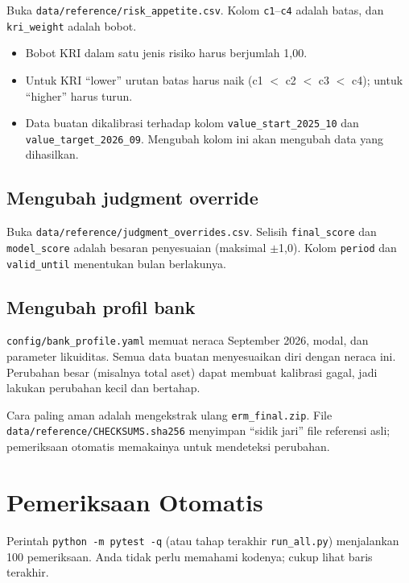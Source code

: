 \documentclass[11pt,a4paper]{article}
\newcommand{\file}[1]{\texttt{\small #1}}
\begin{document}
Buka \file{data/reference/risk\_\allowbreak{}appetite.csv}. Kolom \texttt{c1}--\texttt{c4} adalah batas, dan \texttt{kri\_\allowbreak{}weight} adalah bobot.
\begin{itemize}
\item Bobot KRI dalam satu jenis risiko harus berjumlah 1,00.
\item Untuk KRI ``lower'' urutan batas harus naik (c1 $<$ c2 $<$ c3 $<$ c4); untuk ``higher'' harus turun.
\item Data buatan dikalibrasi terhadap kolom \texttt{value\_\allowbreak{}start\_\allowbreak{}2025\_\allowbreak{}10} dan \texttt{value\_\allowbreak{}target\_\allowbreak{}2026\_\allowbreak{}09}. Mengubah kolom ini akan mengubah data yang dihasilkan.
\end{itemize}

\subsection{Mengubah judgment override}

Buka \file{data/reference/judgment\_\allowbreak{}overrides.csv}. Selisih \texttt{final\_\allowbreak{}score} dan \texttt{model\_\allowbreak{}score} adalah besaran penyesuaian (maksimal $\pm$1,0). Kolom \texttt{period} dan \texttt{valid\_\allowbreak{}until} menentukan bulan berlakunya.

\subsection{Mengubah profil bank}

\file{config/bank\_\allowbreak{}profile.yaml} memuat neraca September 2026, modal, dan parameter likuiditas. Semua data buatan menyesuaikan diri dengan neraca ini. Perubahan besar (misalnya total aset) dapat membuat kalibrasi gagal, jadi lakukan perubahan kecil dan bertahap.

\begin{infobox}
Cara paling aman adalah mengekstrak ulang \file{erm\_\allowbreak{}final.zip}. File \file{data/reference/CHECKSUMS.sha256} menyimpan ``sidik jari'' file referensi asli; pemeriksaan otomatis memakainya untuk mendeteksi perubahan.
\end{infobox}
\section{Pemeriksaan Otomatis}\label{sec:test}

Perintah \texttt{python -m pytest -q} (atau tahap terakhir \texttt{run\_\allowbreak{}all.py}) menjalankan 100 pemeriksaan. Anda tidak perlu memahami kodenya; cukup lihat baris terakhir.
\end{document}
